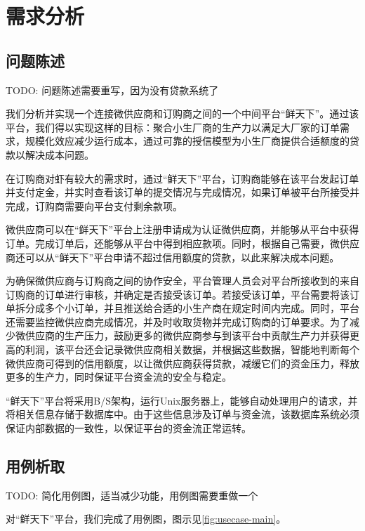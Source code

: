 \chapter{需求分析}

\label{cha:demand_analysis}
\section{问题陈述}

TODO: 问题陈述需要重写，因为没有贷款系统了

我们分析并实现一个连接微供应商和订购商之间的一个中间平台“鲜天下”。通过该平台，我们得以实现这样的目标：聚合小生厂商的生产力以满足大厂家的订单需求，规模化效应减少运行成本，通过可靠的授信模型为小生厂商提供合适额度的贷款以解决成本问题。

在订购商对虾有较大的需求时，通过“鲜天下”平台，订购商能够在该平台发起订单并支付定金，并实时查看该订单的提交情况与完成情况，如果订单被平台所接受并完成，订购商需要向平台支付剩余款项。

微供应商可以在“鲜天下”平台上注册申请成为认证微供应商，并能够从平台中获得订单。完成订单后，还能够从平台中得到相应款项。同时，根据自己需要，微供应商还可以从“鲜天下”平台申请不超过信用额度的贷款，以此来解决成本问题。

为确保微供应商与订购商之间的协作安全，平台管理人员会对平台所接收到的来自订购商的订单进行审核，并确定是否接受该订单。若接受该订单，平台需要将该订单拆分成多个小订单，并且推送给合适的小生产商在规定时间内完成。同时，平台还需要监控微供应商完成情况，并及时收取货物并完成订购商的订单要求。为了减少微供应商的生产压力，鼓励更多的微供应商参与到该平台中贡献生产力并获得更高的利润，该平台还会记录微供应商相关数据，并根据这些数据，智能地判断每个微供应商可得到的信用额度，以让微供应商获得贷款，减缓它们的资金压力，释放更多的生产力，同时保证平台资金流的安全与稳定。

“鲜天下”平台将采用B/S架构，运行Unix服务器上，能够自动处理用户的请求，并将相关信息存储于数据库中。由于这些信息涉及订单与资金流，该数据库系统必须保证内部数据的一致性，以保证平台的资金流正常运转。


\section{用例析取}

TODO: 简化用例图，适当减少功能，用例图需要重做一个

对“鲜天下”平台，我们完成了用例图，图示见\autoref{fig:usecase-main}。

